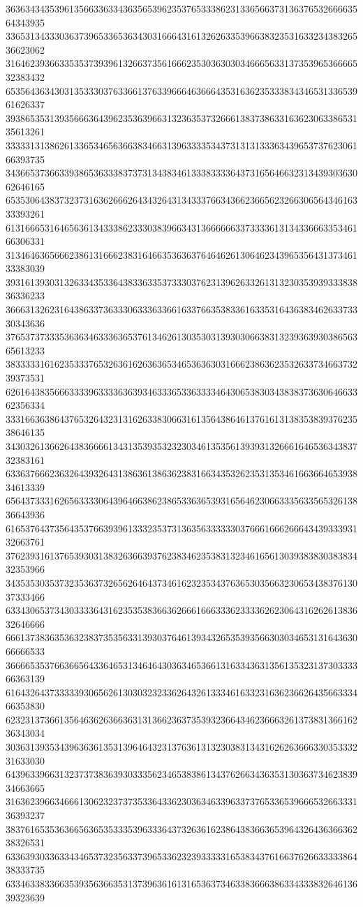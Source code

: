 36363434353961356633633436356539623537653338623133656637313637653266663564343935
33653134333036373965336536343031666431613262633539663832353163323438326536623062
31646239366335353739396132663735616662353036303034666563313735396536666532383432
65356436343031353330376336613763396664636664353163623533383434653133653961626337
39386535313935666364396235363966313236353732666138373863316362306338653135613261
33333131386261336534656366383466313963333534373131313336343965373762306166393735
34366537366339386536333837373134383461333833336437316564663231343930363062646165
65353064383732373163626662643432643134333766343662366562326630656434616333393261
61316665316465636134333862333038396634313666666337333361313433666335346166306331
31346463656662386131666238316466353636376464626130646234396535643137346133383039
39316139303132633435336438336335373330376231396263326131323035393933383836336233
36663132623164386337363330633363366163376635383361633531643638346263373330343636
37653737333536363463336365376134626130353031393030663831323936393038656365613233
38333331616235333765326361626363653465363630316662386362353263373466373239373531
62616438356663333963333636393463336533633334643065383034383837363064663362356334
33316636386437653264323131626338306631613564386461376161313835383937623538646135
34303261366264383666613431353935323230346135356139393132666164653634383732383161
63363766623632643932643138636138636238316634353262353135346166366465393834613339
65643733316265633330643964663862386533636539316564623066333563356532613836643936
61653764373564353766393961333235373136356333333037666166626664343933393132663761
37623931613765393031383263663937623834623538313234616561303938383038383432353966
34353530353732353637326562646437346162323534376365303566323065343837613037333466
63343065373430333364316235353836636266616663336233336262306431626261383632646666
66613738363536323837353563313930376461393432653539356630303465313164363066666533
36666535376636656433646531346464303634653661316334363135613532313730333366363139
61643264373333393065626130303232336264326133346163323163623662643566333466353830
62323137366135646362636636313136623637353932366434623666326137383136616236343034
30363139353439636361353139646432313763613132303831343162626366633035333231633030
64396339663132373738363930333562346538386134376266343635313036373462383934663665
31636239663466613062323737353364336230363463396337376533653966653266333136393237
38376165353636656365353335396333643732636162386438366365396432643636636238326531
63363930336334346537323563373965336232393333316538343761663762663333386438333735
63346338336635393563663531373963616131653637346338366638633433383264613639323639
